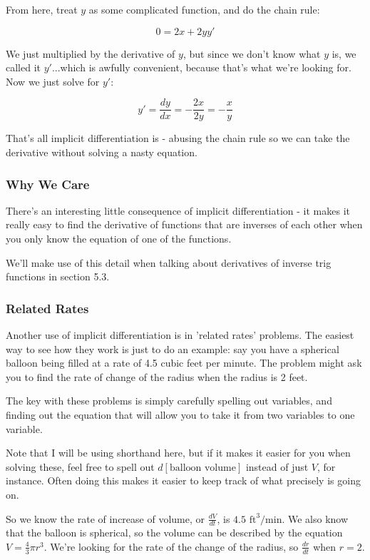 From here, treat $y$ as some complicated function, and do the chain rule:

\begin{equation*}
    0 = 2x + 2yy'
\end{equation*}

We just multiplied by the derivative of $y$, but since we don't know what $y$ is, we called it $y'$...which is awfully convenient, because that's what we're looking for. Now we just solve for $y'$:

\begin{equation*}
    y' = \frac{dy}{dx} = -\frac{2x}{2y} = -\frac{x}{y}
\end{equation*}

That's all implicit differentiation is - abusing the chain rule so we can take the derivative without solving a nasty equation.
\subsubsection{Why We Care}

There's an interesting little consequence of implicit differentiation - it makes it really easy to find the derivative of functions that are inverses of each other when you only know the equation of one of the functions.

We'll make use of this detail when talking about derivatives of inverse trig functions in section 5.3.

\subsubsection{Related Rates}

Another use of implicit differentiation is in 'related rates' problems. The easiest way to see how they work is just to do an example: say you have a spherical balloon being filled at a rate of 4.5 cubic feet per minute. The problem might ask you to find the rate of change of the radius when the radius is 2 feet. 

The key with these problems is simply carefully spelling out variables, and finding out the equation that will allow you to take it from two variables to one variable.

Note that I will be using shorthand here, but if it makes it easier for you when solving these, feel free to spell out $d[\text{balloon volume}]$ instead of just $V$, for instance. Often doing this makes it easier to keep track of what precisely is going on.

So we know the rate of increase of volume, or $\frac{dV}{dt}$, is $4.5 \text{ ft}^3\text{/min}$. We also know that the balloon is spherical, so the volume can be described by the equation $V = \frac{4}{3}\pi r^3$. We're looking for the rate of the change of the radius, so $\frac{dr}{dt}$ when $r=2$.


